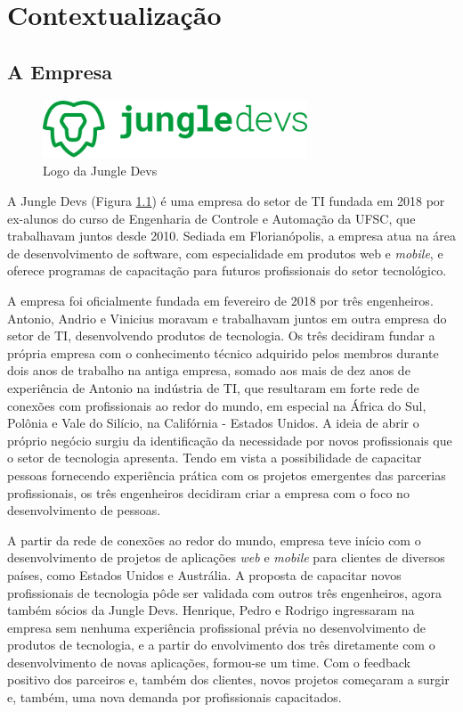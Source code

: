 \chapter{Contextualização}

\section{A Empresa}
\begin{figure}[h]
    \centering
    \includegraphics[width=0.7\textwidth]{pfc/figuras/jungledevs.png}
    \caption{Logo da Jungle Devs}
    \label{fig:jungledevs}
\end{figure}
A Jungle Devs (Figura \ref{fig:jungledevs}) é uma empresa do setor de TI fundada em 2018 por ex-alunos do curso de Engenharia de Controle e Automação da UFSC, que trabalhavam juntos desde 2010. Sediada em Florianópolis, a empresa atua na área de desenvolvimento de software, com especialidade em produtos web e \textit{mobile}, e oferece programas de capacitação para futuros profissionais do setor tecnológico.

A empresa foi oficialmente fundada em fevereiro de 2018 por três engenheiros. Antonio, Andrio e Vinicius moravam e trabalhavam juntos em outra empresa do setor de TI, desenvolvendo produtos de tecnologia. Os três decidiram fundar a própria empresa com o conhecimento técnico adquirido pelos membros durante dois anos de trabalho na antiga empresa, somado aos mais de dez anos de experiência de Antonio na indústria de TI, que resultaram em forte rede de conexões com profissionais ao redor do mundo, em especial na África do Sul, Polônia e Vale do Silício, na Califórnia - Estados Unidos. A ideia de abrir o próprio negócio surgiu da identificação da necessidade por novos profissionais que o setor de tecnologia apresenta. Tendo em vista a possibilidade de capacitar pessoas fornecendo experiência prática com os projetos emergentes das parcerias profissionais, os três engenheiros decidiram criar a empresa com o foco no desenvolvimento de pessoas.

A partir da rede de conexões ao redor do mundo, empresa teve início com o desenvolvimento de projetos de aplicações \textit{web} e \textit{mobile} para clientes de diversos países, como Estados Unidos e Austrália. A proposta de capacitar novos profissionais de tecnologia pôde ser validada com outros três engenheiros, agora também sócios da Jungle Devs. Henrique, Pedro e Rodrigo ingressaram na empresa sem nenhuma experiência profissional prévia no desenvolvimento de produtos de tecnologia, e a partir do envolvimento dos três diretamente com o desenvolvimento de novas aplicações, formou-se um time. Com o feedback positivo dos parceiros e, também dos clientes, novos projetos começaram a surgir e, também, uma nova demanda por profissionais capacitados.

